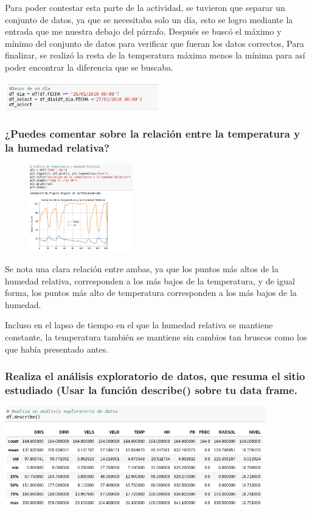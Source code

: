 \documentclass{article} %
\begin{document}
Para poder contestar esta parte de la actividad, se tuvieron que separar un conjunto de datos, ya que se necesitaba solo un día, esto se logro mediante la entrada que me nuestra debajo del párrafo. Después se buscó el máximo y mínimo del conjunto de datos para verificar que fueran los datos correctos, Para finalizar, se realizó la resta de la temperatura máxima menos la mínima para así poder encontrar la diferencia que se buscaba.
\begin{center}
    \includegraphics[width=0.5\textwidth]{Datosdia.png}
\end{center}

\subsubsection {¿Puedes comentar sobre la relación entre la temperatura y la humedad relativa?}
\begin{figure}
  \centering
  \includegraphics[width=0.4\textwidth]{TempHum.png}
  \label{fig:Actividades}
\end{figure}
Se nota una clara relación entre ambas, ya que los puntos más altos de la humedad relativa, corresponden a los más bajos de la temperatura, y de igual forma, los puntos más alto de temperatura corresponden a los más bajos de la humedad. 

Incluso en el lapso de tiempo en el que la humedad relativa se mantiene constante, la temperatura también se mantiene sin cambios tan bruscos como los que había presentado antes.

\subsubsection {Realiza el análisis exploratorio de datos, que resuma el sitio estudiado (Usar la función describe() sobre tu data frame.}
\begin{center}
    \includegraphics[width=0.85\textwidth]{analisis.png}
\end{center}
\end{document}
